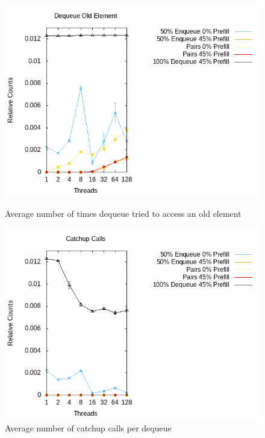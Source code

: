 \documentclass{article}      %
\begin{document}
\begin{figure}[H]
	\centering
	
	\includegraphics[width=\textwidth]{Pictures/diss_deq_old_red.png}
	\caption{Average number of times dequeue tried to access an old element}
	\label{fig:diss_red_deq_old}
	\endminipage\hfill
	\includegraphics[width=\textwidth]{Pictures/diss_deq_catchup_red.png}
	\caption{Average number of catchup calls per dequeue}
	\label{fig:diss_red_catchup}
	\endminipage\hfill
\end{figure}
\end{document}
